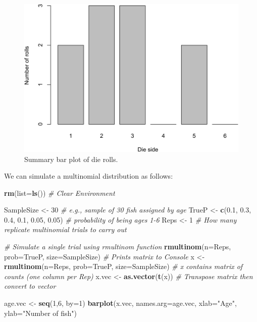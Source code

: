 \documentclass[
]{krantz}
\makeatletter
\newenvironment{Shaded}{\begin{snugshade}}{\end{snugshade}}
\newcommand{\AttributeTok}[1]{\textcolor[rgb]{0.27,0.27,0.27}{#1}}
\newcommand{\CommentTok}[1]{\textcolor[rgb]{0.37,0.37,0.37}{\textit{#1}}}
\newcommand{\DecValTok}[1]{\textcolor[rgb]{0.06,0.06,0.06}{#1}}
\newcommand{\FloatTok}[1]{\textcolor[rgb]{0.06,0.06,0.06}{#1}}
\newcommand{\FunctionTok}[1]{\textcolor[rgb]{0.27,0.27,0.27}{\textbf{#1}}}
\newcommand{\NormalTok}[1]{#1}
\newcommand{\OtherTok}[1]{\textcolor[rgb]{0.37,0.37,0.37}{#1}}
\newcommand{\StringTok}[1]{\textcolor[rgb]{0.5,0.5,0.5}{#1}}
\newenvironment{kframe}{%
\medskip{}
\setlength{\fboxsep}{.8em}
 \def\at@end@of@kframe{}%
 \ifinner\ifhmode%
  \def\at@end@of@kframe{\end{minipage}}%
  \begin{minipage}{\columnwidth}%
 \fi\fi%
 \def\FrameCommand##1{\hskip\@totalleftmargin \hskip-\fboxsep
 \colorbox{shadecolor}{##1}\hskip-\fboxsep
     \hskip-\linewidth \hskip-\@totalleftmargin \hskip\columnwidth}%
 \MakeFramed {\advance\hsize-\width
   \@totalleftmargin\z@ \linewidth\hsize
   \@setminipage}}%
 {\par\unskip\endMakeFramed%
 \at@end@of@kframe}
\renewenvironment{Shaded}{\begin{kframe}}{\end{kframe}}
\makeatother
\begin{document}
\begin{figure}
\includegraphics[width=0.9\linewidth]{bookdown_files/figure-latex/dieRoll-1} \caption{Summary bar plot of die rolls.}\label{fig:dieRoll}
\end{figure}

We can simulate a multinomial distribution as follows:

\begin{Shaded}
\begin{Highlighting}[]
\FunctionTok{rm}\NormalTok{(}\AttributeTok{list=}\FunctionTok{ls}\NormalTok{()) }\CommentTok{\# Clear Environment}

\NormalTok{SampleSize }\OtherTok{\textless{}{-}} \DecValTok{30}  \CommentTok{\# e.g., sample of 30 fish assigned by age}
\NormalTok{TrueP }\OtherTok{\textless{}{-}} \FunctionTok{c}\NormalTok{(}\FloatTok{0.1}\NormalTok{, }\FloatTok{0.3}\NormalTok{, }\FloatTok{0.4}\NormalTok{, }\FloatTok{0.1}\NormalTok{, }\FloatTok{0.05}\NormalTok{, }\FloatTok{0.05}\NormalTok{) }
  \CommentTok{\# probability of being ages 1{-}6}
\NormalTok{Reps }\OtherTok{\textless{}{-}} \DecValTok{1} \CommentTok{\# How many replicate multinomial trials to carry out}

\CommentTok{\# Simulate a single trial using rmultinom function}
\FunctionTok{rmultinom}\NormalTok{(}\AttributeTok{n=}\NormalTok{Reps, }\AttributeTok{prob=}\NormalTok{TrueP, }\AttributeTok{size=}\NormalTok{SampleSize) }
  \CommentTok{\# Prints matrix to Console}
\NormalTok{x }\OtherTok{\textless{}{-}} \FunctionTok{rmultinom}\NormalTok{(}\AttributeTok{n=}\NormalTok{Reps, }\AttributeTok{prob=}\NormalTok{TrueP, }\AttributeTok{size=}\NormalTok{SampleSize)}
\CommentTok{\# x contains matrix of counts (one column per Rep)}
\NormalTok{x.vec }\OtherTok{\textless{}{-}} \FunctionTok{as.vector}\NormalTok{(}\FunctionTok{t}\NormalTok{(x)) }\CommentTok{\# Transpose matrix then convert to vector}

\NormalTok{age.vec }\OtherTok{\textless{}{-}} \FunctionTok{seq}\NormalTok{(}\DecValTok{1}\NormalTok{,}\DecValTok{6}\NormalTok{, }\AttributeTok{by=}\DecValTok{1}\NormalTok{)}
\FunctionTok{barplot}\NormalTok{(x.vec, }\AttributeTok{names.arg=}\NormalTok{age.vec, }\AttributeTok{xlab=}\StringTok{"Age"}\NormalTok{, }\AttributeTok{ylab=}\StringTok{"Number of fish"}\NormalTok{)}
\end{Highlighting}
\end{Shaded}
\end{document}
